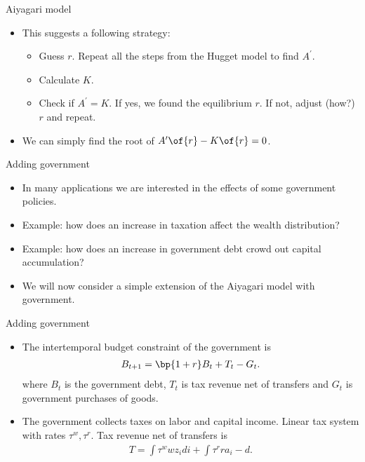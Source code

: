 \documentclass[11pt,xcolor={dvipsnames},aspectratio=159,hyperref={pdftex,pdfpagemode=UseNone,hidelinks,pdfdisplaydoctitle=true},usepdftitle=false]{beamer}
\begin{document}
    \begin{frame}{Aiyagari model}
        \begin{itemize}
            \item This suggests a following strategy:
            \begin{itemize}
            \item Guess $r$. Repeat all the steps from the Hugget model to find $A^\prime$.
            \item Calculate $K$.
            \item Check if $A^\prime = K$. If yes, we found the equilibrium $r$. If not, adjust (how?) $r$ and repeat.
            \end{itemize}
            \item We can simply find the root of $A^\prime\of{r} - K\of{r}=0$.
        \end{itemize}
        \end{frame}        

    \begin{frame}{Adding government}
        \begin{itemize}
            \item In many applications we are interested in the effects of some government policies.
            \item Example: how does an increase in taxation affect the wealth distribution?
            \item Example: how does an increase in government debt crowd out capital accumulation?
            \item We will now consider a simple extension of the Aiyagari model with government.
            \end{itemize}
        \end{frame}        

    \begin{frame}{Adding government}
        \begin{itemize}
            \item The intertemporal budget constraint of the government is \begin{align*}
                B_{t+1} = \bp{1+r}B_t + T_t - G_t.
            \end{align*}
            where $B_t$ is the government debt, $T_t$ is tax revenue net of transfers and $G_t$ is government purchases of goods.
            \item The government collects taxes on labor and capital income. Linear tax system with rates $\tau^w, \tau^r$. Tax revenue net of transfers is \begin{align*}
                T = \int \tau^w w z_i di + \int \tau^r r a_i - d.
            \end{align*}
            \end{itemize}
        \end{frame}       
\end{document}
